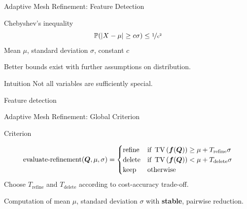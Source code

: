 \documentclass[aspectratio=169]{beamer}
\begin{document}
\begin{frame}{Adaptive Mesh Refinement: Feature Detection}
  \begin{block}{Chebyshev's inequality}
\begin{equation}
  \label{eq:chebychev}
  \mathbb{P}(\vert X - \mu \vert \geq c \sigma) \leq \nicefrac{1}{c^2}
\end{equation}
Mean $\mu$, standard deviation $\sigma$, constant $c$

Better bounds exist with further assumptions on distribution.
\end{block}

\begin{block}{Intuition}
Not all variables are sufficiently special.

Feature detection
\end{block}

\end{frame}
  
\begin{frame}{Adaptive Mesh Refinement: Global Criterion}
\begin{block}{Criterion}
  
\begin{equation}
  \label{eq:refinement-criterion}
  \operatorname{evaluate-refinement}(\bm{Q}, \mu, \sigma) =
  \begin{cases}
    \text{refine} & \text{if } \operatorname{TV}\left(\bm{f}(\bm{Q})\right) \geq \mu + T_\text{refine} \sigma \\
    \text{delete} & \text{if } \operatorname{TV}\left(\bm{f}(\bm{Q})\right) < \mu + T_\text{delete} \sigma \\
    \text{keep} & \text{otherwise}
    \end{cases}
\end{equation}
Choose $T_\text{refine}$ and $T_\text{delete}$ according to cost-accuracy trade-off.

Computation of mean $\mu$, standard deviation $\sigma$ with \textbf{stable}, pairwise reduction.
\end{block}
\end{frame}  
\end{document}
